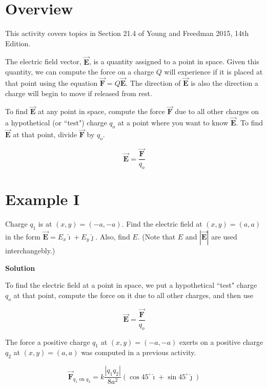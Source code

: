 \documentclass{article}
\newcommand{\ihat}[0]{\hat{\boldsymbol{\imath}}}
\newcommand{\jhat}[0]{\hat{\boldsymbol{\jmath}}}
\newcommand{\bfvec}[1]{\vec{\mathbf{#1}}}
\begin{document}
\section{Overview}

This activity covers topics in Section 21.4 of Young and Freedman 2015, 14th Edition.

The electric field vector, $\bfvec{E}$, is a quantity assigned to a point in space. Given this quantity, we can compute the force on a charge $Q$ will experience if it is placed at that point using the equation $\bfvec{F}=Q\bfvec{E}$. The direction of $\bfvec{E}$ is also the direction a charge will begin to move if released from rest.

To find $\bfvec{E}$ at any point in space, 
compute the force $\bfvec{F}$ due to all other charges on a hypothetical (or ``test") charge $q_o$ at a point where you want to know $\bfvec{E}$. To find $\bfvec{E}$ at that point, divide $\bfvec{F}$ by $q_o$.

\begin{equation}
\bfvec{E} = \frac{\bfvec{F}}{q_o}
\end{equation}


\section{Example I}

Charge $q_1$ is at $(x,y)=(-a,-a)$. Find the electric field at $(x,y)=(a,a)$ in the form $\bfvec{E}=E_x\ihat + E_y\jhat$. Also, find $E$. (Note that $E$ and $|\bfvec{E}|$ are used interchangebly.)

\textbf{Solution}

To find the electric field at a point in space, we put a hypothetical ``test" charge $q_o$ at that point, compute the force on it due to all other charges, and then use

\begin{equation}
\bfvec{E} = \frac{\bfvec{F}}{q_o}
\end{equation}

The force a positive charge $q_1$ at $(x,y)=(-a,-a)$ exerts on a positive charge $q_2$ at $(x,y)=(a, a)$ was computed in a previous activity.

\begin{equation}
\bfvec{F}_{q_1\text{ on } q_2}=k\frac{|q_1q_2|}{8a^2}(\cos 45^\circ \ihat + \sin 45^\circ \jhat)
\end{equation}
\end{document}
